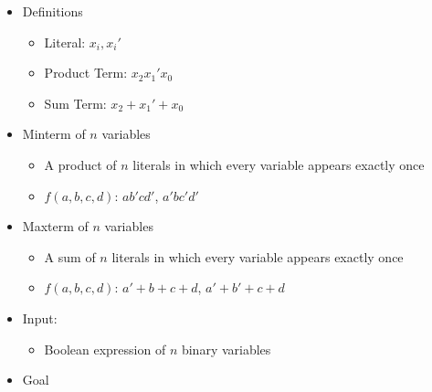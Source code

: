 \begin{itemize}

  \item Definitions

    \begin{itemize}

      \item Literal: $x_i, x_i'$

      \item Product Term: $x_2x_1'x_0$

      \item Sum Term: $x_2 + x_1' + x_0$

    \end{itemize}

  \item Minterm of $n$ variables

    \begin{itemize}

      \item A product of $n$ literals in which every variable appears exactly once

      \item  $f(a,b,c,d)$: $ab'cd'$, $a'bc'd'$

    \end{itemize}

  \item Maxterm of $n$ variables

    \begin{itemize}

      \item A sum of $n$ literals in which every variable appears exactly once

      \item $f(a,b,c,d)$: $a'+b+c+d$, $a'+b'+c+d$

    \end{itemize}

  \item Input:

    \begin{itemize}
        
      \item Boolean expression of $n$ binary variables

    \end{itemize}

  \item Goal

    \begin{itemize}


\end{itemize}
\end{itemize}

